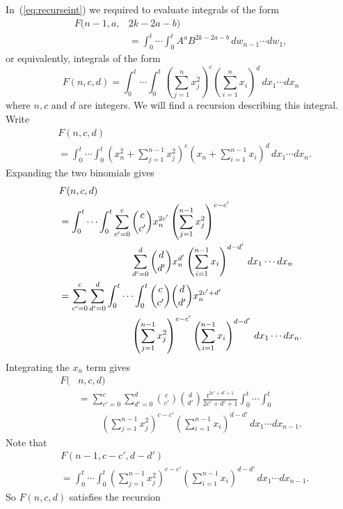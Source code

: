 \documentclass[journal]{IEEEtran}
\begin{document}
In~(\ref{eq:recurseint}) we required to evaluate integrals of the form
\begin{align*}
F(n-1,a,&2k - 2a - b) \\
&= \int^{t}_{0} \cdots \int^{t}_{0} A^a B^{2k - 2a - b} \,dw_{n-1}\cdots dw_{1},
\end{align*}
or equivalently, integrals of the form
\[
F(n,c,d) = \int^{t}_{0} \cdots \int^{t}_{0} \left(\sum_{j=1}^{n} x_j^2\right)^c \left( \sum_{i=1}^{n} x_i \right)^d \,dx_1\cdots dx_{n}
\]
where $n, c$ and $d$ are integers.  We will find a recursion describing this integral.  Write
\begin{align*}
&F(n,c,d) \\
&= \int^t_0 \cdots \int^t_0 \left(x_n^2 + \sum_{j=1}^{n-1} x_j^2\right)^c \left( x_n + \sum_{i=1}^{n-1} x_i \right)^d \,dx_1\cdots dx_n.
\end{align*}
Expanding the two binomials gives
\begin{align*}
&F(n,c,d) \\
&=  \int^t_0 \cdots \int^t_0  \sum_{c'=0}^{c} \binom{c}{c'} x_n^{2c'} \left(\sum_{j=1}^{n-1} x_j^2\right)^{c-c'}  \\
& \hspace{2.6cm}  \sum_{d'=0}^{d}\binom{d}{d'} x_n^{d'} \left(\sum_{i=1}^{n-1} x_i \right)^{d-d'} \,dx_1\cdots dx_{n}  \\
&= \sum_{c'=0}^{c} \sum_{d'=0}^d \int^t_0 \cdots \int^t_0 \binom{c}{c'} \binom{d}{d'} x_n^{2c'+d'} \\ 
& \hspace{2.6cm} \left(\sum_{j=1}^{n-1} x_j^2\right)^{c-c'} \left(\sum_{i=1}^{n-1} x_i \right)^{d-d'} \,dx_1\cdots dx_{n}.
\end{align*}
Integrating the $x_n$ term gives
\begin{align*}
F(&n,c,d) \\
&= \sum_{c'=0}^{c} \sum_{d'=0}^{d} \binom{c}{c'}\binom{d}{d'} \frac{t^{2c'+d'+1}}{2c'+d'+1} \int^t_0 \cdots \int^t_0 \\
& \hspace{1cm} \left(\sum_{j=1}^{n-1}x_j^2\right)^{c-c'}\left(\sum_{i=1}^{n-1} x_i \right)^{d-d'} \,dx_1\cdots dx_{n-1}.
\end{align*}
Note that
\begin{align*}
&F(n-1,c-c',d-d')  \\
&= \int^t_0 \cdots \int^t_0 \left(\sum_{j=1}^{n-1}x_j^2\right)^{c-c'}\left(\sum_{i=1}^{n-1} x_i \right)^{d-d'} \,dx_1\cdots dx_{n-1}.
\end{align*}
So $F(n,c,d)$ satisfies the recursion
\end{document}
